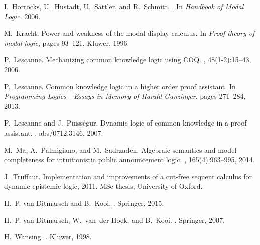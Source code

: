 \documentclass[runningheads,a4paper]{llncs}
\begin{document}
\begin{thebibliography}{10}
I.~Horrocks, U.~Hustadt, U.~Sattler, and R.~Schmitt.
.
\newblock In {\em Handbook of Modal Logic}. 2006.

M.~Kracht.
\newblock Power and weakness of the modal display calculus.
\newblock In {\em Proof theory of modal logic}, pages 93--121. Kluwer, 1996.

P.~Lescanne.
\newblock Mechanizing common knowledge logic using {COQ}.
, 48(1-2):15--43, 2006.

P.~Lescanne.
\newblock Common knowledge logic in a higher order proof assistant.
\newblock In {\em Programming Logics - Essays in Memory of Harald Ganzinger},
  pages 271--284, 2013.

P.~Lescanne and J.~Puiss{\'{e}}gur.
\newblock Dynamic logic of common knowledge in a proof assistant.
, abs/0712.3146, 2007.

M.~Ma, A.~Palmigiano, and M.~Sadrzadeh.
\newblock Algebraic semantics and model completeness for intuitionistic public
  announcement logic.
, 165(4):963--995, 2014.

J.~Truffaut.
\newblock Implementation and improvements of a cut-free sequent calculus for
  dynamic epistemic logic, 2011.
\newblock MSc thesis, University of Oxford.

H.~P. van Ditmarsch and B.~Kooi.
.
\newblock Springer, 2015.

H.~P. van Ditmarsch, W.~van~der Hoek, and B.~Kooi.
.
\newblock Springer, 2007.

H.~Wansing.
.
\newblock Kluwer, 1998.

\end{thebibliography}

\appendix
\end{document}
